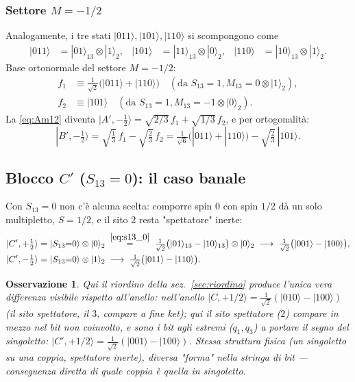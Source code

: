 \documentclass[11pt,a4paper]{article}
\newtheorem{osservazione}{Osservazione}
\begin{document}
\subsubsection{Settore $M={-}1/2$}

Analogamente, i tre stati $|011\rangle,|101\rangle,|110\rangle$ si scompongono come
\begin{align}
|011\rangle &= |01\rangle_{13}\otimes|1\rangle_2, &
|101\rangle &= |11\rangle_{13}\otimes|0\rangle_2, &
|110\rangle &= |10\rangle_{13}\otimes|1\rangle_2 .
\end{align}
Base ortonormale del settore $M{=}{-}1/2$:
\begin{align*}
f_1 &\equiv \tfrac1{\sqrt2}\big(|011\rangle+|110\rangle\big) \quad(\text{da }S_{13}{=}1,M_{13}{=}0\otimes|1\rangle_2),\\
f_2 &\equiv |101\rangle \quad(\text{da }S_{13}{=}1,M_{13}{=}{-}1\otimes|0\rangle_2).
\end{align*}
La \eqref{eq:Am12} diventa
$|A',{-}\tfrac12\rangle=\sqrt{2/3}\,f_1+\sqrt{1/3}\,f_2$, e per ortogonalità:
\begin{equation}
|B',{-}\tfrac12\rangle = \sqrt{\tfrac13}\,f_1-\sqrt{\tfrac23}\,f_2
= \tfrac1{\sqrt6}\big(|011\rangle+|110\rangle\big) - \sqrt{\tfrac23}\,|101\rangle .
\label{eq:Bm12}
\end{equation}

\subsection{Blocco $C'$ ($S_{13}=0$): il caso banale}

Con $S_{13}=0$ non c'è alcuna scelta: comporre spin $0$ con spin $1/2$ dà un
solo multipletto, $S=1/2$, e il sito $2$ resta "spettatore" inerte:
\begin{align}
|C',{+}\tfrac12\rangle &= |S_{13}{=}0\rangle\otimes|0\rangle_2
\;\overset{\eqref{eq:s13_0}}{=}\; \tfrac1{\sqrt2}\big(|01\rangle_{13}-|10\rangle_{13}\big)\otimes|0\rangle_2
\;\longrightarrow\; \tfrac1{\sqrt2}\big(|001\rangle-|100\rangle\big), \label{eq:Cp12}\\
|C',{-}\tfrac12\rangle &= |S_{13}{=}0\rangle\otimes|1\rangle_2
\;\longrightarrow\; \tfrac1{\sqrt2}\big(|011\rangle-|110\rangle\big). \label{eq:Cm12}
\end{align}

\begin{osservazione}
Qui il riordino della sez.~\ref{sec:riordino} produce l'unica vera
differenza visibile rispetto all'anello: nell'anello $|C,+1/2\rangle=\tfrac1{\sqrt2}(|010\rangle-|100\rangle)$
(il sito spettatore, il $3$, compare \emph{a fine} ket); qui il sito
spettatore ($2$) compare \emph{in mezzo} nel bit non coinvolto, e sono i
bit agli \emph{estremi} ($q_1,q_3$) a portare il segno del singoletto:
$|C',+1/2\rangle=\tfrac1{\sqrt2}(|001\rangle-|100\rangle)$. Stessa struttura
fisica (un singoletto su una coppia, spettatore inerte), diversa
"forma" nella stringa di bit — conseguenza diretta di quale coppia è quella
in singoletto.
\end{osservazione}
\end{document}
